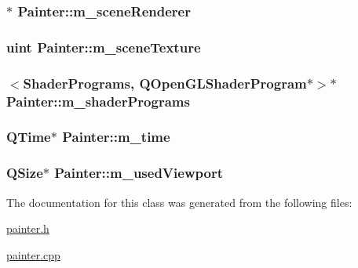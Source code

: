 \hypertarget{class_painter_a574ba64fd2af1d8c64d2c293d4811fc2}{
\subsubsection[{m\+\_\+scene\+Renderer}]{$\ast$ Painter\+::m\+\_\+scene\+Renderer\hspace{0.3cm}{\ttfamily [protected]}}}\label{class_painter_a574ba64fd2af1d8c64d2c293d4811fc2}
\hypertarget{class_painter_af82c25060227ea6ec91ae60f0753c593}{
\subsubsection[{m\+\_\+scene\+Texture}]{\setlength{\rightskip}{0pt plus 5cm}uint Painter\+::m\+\_\+scene\+Texture\hspace{0.3cm}{\ttfamily [protected]}}}\label{class_painter_af82c25060227ea6ec91ae60f0753c593}
\hypertarget{class_painter_a30655a30ba8f540f0e28b976b97d126f}{
\subsubsection[{m\+\_\+shader\+Programs}]{$<${\bf Shader\+Programs}, Q\+Open\+G\+L\+Shader\+Program$\ast$$>$$\ast$ Painter\+::m\+\_\+shader\+Programs\hspace{0.3cm}{\ttfamily [protected]}}}\label{class_painter_a30655a30ba8f540f0e28b976b97d126f}
\hypertarget{class_painter_ab6976ab19027866bbb01e9a1504aa5c9}{
\subsubsection[{m\+\_\+time}]{\setlength{\rightskip}{0pt plus 5cm}Q\+Time$\ast$ Painter\+::m\+\_\+time\hspace{0.3cm}{\ttfamily [protected]}}}\label{class_painter_ab6976ab19027866bbb01e9a1504aa5c9}
\hypertarget{class_painter_aff5d274eb90d7a94565effe5bd5d03f7}{
\subsubsection[{m\+\_\+used\+Viewport}]{\setlength{\rightskip}{0pt plus 5cm}Q\+Size$\ast$ Painter\+::m\+\_\+used\+Viewport\hspace{0.3cm}{\ttfamily [protected]}}}\label{class_painter_aff5d274eb90d7a94565effe5bd5d03f7}


The documentation for this class was generated from the following files\+:\begin{DoxyCompactItemize}
\item 
\hyperlink{painter_8h}{painter.\+h}\item 
\hyperlink{painter_8cpp}{painter.\+cpp}\end{DoxyCompactItemize}
